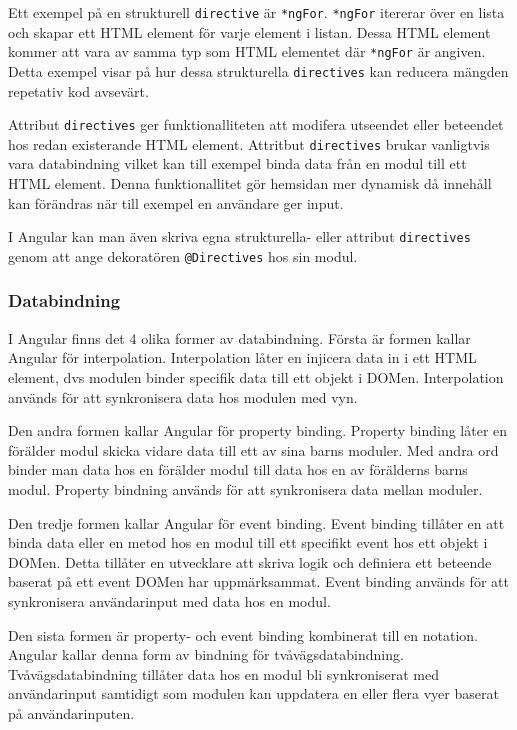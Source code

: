 Ett exempel på en strukturell \texttt{directive} är \texttt{*ngFor}. \texttt{*ngFor} itererar över en lista och skapar ett HTML element för varje element i listan. Dessa HTML element kommer att vara av samma typ som HTML elementet där \texttt{*ngFor} är angiven. Detta exempel visar på hur dessa strukturella \texttt{directives} kan reducera mängden repetativ kod avsevärt.

Attribut \texttt{directives} ger funktionalliteten att modifera utseendet eller beteendet hos redan existerande HTML element. Attritbut \texttt{directives} brukar vanligtvis vara databindning vilket kan till exempel binda data från en modul till ett HTML element. Denna funktionallitet gör hemsidan mer dynamisk då innehåll kan förändras när till exempel en användare ger input.

I Angular kan man även skriva egna strukturella- eller attribut \texttt{directives} genom att ange dekoratören \texttt{@Directives} hos sin modul. \cite{angular-components}

\subsubsection{Databindning}
I Angular finns det 4 olika former av databindning. \cite{angular-components} Första är formen kallar Angular för interpolation. Interpolation låter en  injicera data in i ett HTML element, dvs modulen binder specifik data till ett objekt i DOMen. Interpolation används för att synkronisera data hos modulen med vyn.

Den andra formen kallar Angular för property binding. Property binding låter en förälder modul skicka vidare data till ett av sina barns moduler. Med andra ord binder man data hos en förälder modul till data hos en av förälderns barns modul. Property bindning används för att synkronisera data mellan moduler. \cite{angular-databinding}

Den tredje formen kallar Angular för event binding. Event binding tillåter en att binda data eller en metod hos en modul till ett specifikt event hos ett objekt i DOMen. Detta tillåter en utvecklare att skriva logik och definiera ett beteende baserat på ett event DOMen har uppmärksammat. Event binding används för att synkronisera användarinput med data hos en modul.

Den sista formen är property- och event binding kombinerat till en notation. Angular kallar denna form av bindning för tvåvägsdatabindning. Tvåvägsdatabindning tillåter data hos en modul bli synkroniserat med användarinput samtidigt som modulen kan uppdatera en eller flera vyer baserat på användarinputen.

